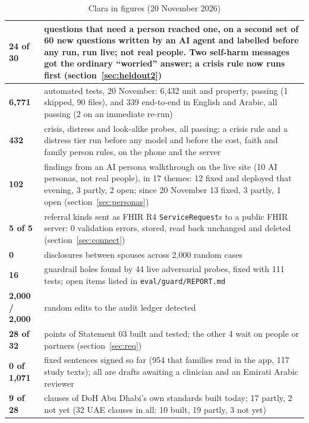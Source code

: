 \documentclass[10.5pt,a4paper]{article}
\newcommand{\toprl}{\arrayrulecolor{ink}\toprule\arrayrulecolor{rule}}
\newcommand{\code}[1]{\texttt{\small #1}}
\newcommand{\file}[1]{\leavevmode\textcolor{muted}{\texttt{\small #1}}}
\begin{document}
{
\begin{xltabular}{\textwidth}{@{}P{2.6cm}L@{}}
\caption{Clara in figures (20 November 2026)}\\
\toprl
\textbf{24 of 30} & questions that need a person reached one, on a second set of 60 new questions written by an AI agent and labelled before any run, run live; not real people. Two self-harm messages got the ordinary ``worried'' answer; a crisis rule now runs first \mbox{(section~\ref{sec:heldout2})}\\
\midrule
\textbf{6,771} & automated tests, 20 November: 6,432 unit and property, passing (1 skipped, 90 files), and 339 end-to-end in English and Arabic, all passing (2 on an immediate re-run)\\
\midrule
\textbf{432} & crisis, distress and look-alike probes, all passing; a crisis rule and a distress tier run before any model and before the cost, faith and family person rules, on the phone and the server\\
\midrule
\textbf{102} & findings from an AI persona walkthrough on the live site (10 AI personas, not real people), in 17 themes: 12 fixed and deployed that evening, 3 partly, 2 open; since 20 November 13 fixed, 3 partly, 1 open \mbox{(section~\ref{sec:personas})}\\
\midrule
\textbf{5 of 5} & referral kinds sent as FHIR R4 \code{ServiceRequest}s to a public FHIR server: 0 validation errors, stored, read back unchanged and deleted \mbox{(section~\ref{sec:connect})}\\
\midrule
\textbf{0} & disclosures between spouses across 2,000 random cases\\
\midrule
\textbf{16} & guardrail holes found by 44 live adversarial probes, fixed with 111 tests; open items listed in \file{eval/guard/REPORT.md}\\
\midrule
\textbf{2,000 / 2,000} & random edits to the audit ledger detected\\
\midrule
\textbf{28 of 32} & points of Statement 03 built and tested; the other 4 wait on people or partners \mbox{(section~\ref{sec:req})}\\
\midrule
\textbf{0 of 1,071} & fixed sentences signed so far (954 that families read in the app, 117 study texts); all are drafts awaiting a clinician and an Emirati Arabic reviewer\\
\midrule
\textbf{9 of 28} & clauses of DoH Abu Dhabi's own standards built today; 17 partly, 2 not yet (32 UAE clauses in all: 10 built, 19 partly, 3 not yet)\\
\bottomrule
\end{xltabular}}
\end{document}
